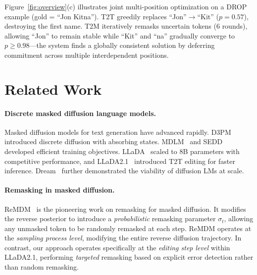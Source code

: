 \documentclass{article}
\newcommand{\TtoT}{\textrm{T2T}}
\newcommand{\TtoM}{\textrm{T2M}}
\begin{document}
Figure~\ref{fig:overview}(c) illustrates joint multi-position optimization on a DROP example (gold = ``Jon Kitna''). \TtoT{} greedily replaces ``Jon''$\to$``Kit'' ($p{=}0.57$), destroying the first name. \TtoM{} iteratively remasks uncertain tokens (6 rounds), allowing ``Jon'' to remain stable while ``Kit'' and ``na'' gradually converge to $p{\geq}0.98$---the system finds a globally consistent solution by deferring commitment across multiple interdependent positions.

\section{Related Work}
\label{sec:related}

\paragraph{Discrete masked diffusion language models.}
Masked diffusion models for text generation have advanced rapidly. D3PM~\citep{austin2021d3pm} introduced discrete diffusion with absorbing states. MDLM~\citep{sahoo2024mdlm} and SEDD~\citep{lou2024sedd} developed efficient training objectives. LLaDA~\citep{nie2025llada} scaled to 8B parameters with competitive performance, and LLaDA2.1~\citep{nie2026llada21} introduced \TtoT{} editing for faster inference. Dream~\citep{ye2025dream} further demonstrated the viability of diffusion LMs at scale.

\paragraph{Remasking in masked diffusion.}
ReMDM~\citep{wang2025remdm} is the pioneering work on remasking for masked diffusion. It modifies the reverse posterior to introduce a \emph{probabilistic} remasking parameter $\sigma_t$, allowing any unmasked token to be randomly remasked at each step. ReMDM operates at the \emph{sampling process level}, modifying the entire reverse diffusion trajectory. In contrast, our approach operates specifically at the \emph{editing step level} within LLaDA2.1, performing \emph{targeted} remasking based on explicit error detection rather than random remasking.
\end{document}
